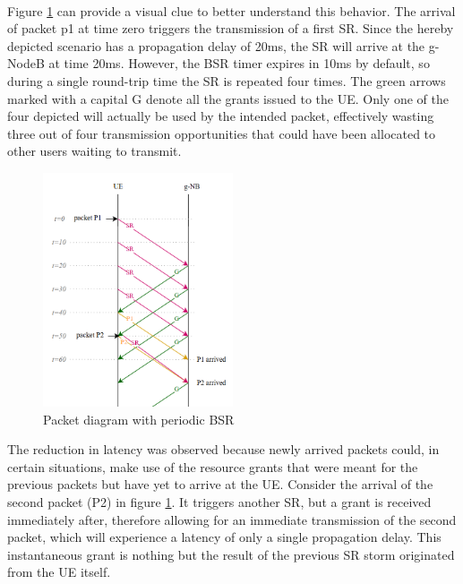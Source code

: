 \paragraph{}
Figure \ref{fig:diagram-wasted-capacity} can provide a visual clue to better understand this behavior. The arrival of packet p1 at time zero triggers the transmission of a first \ac{SR}. Since the hereby depicted scenario has a propagation delay of 20ms, the \ac{SR} will arrive at the g-NodeB at time 20ms. However, the \ac{BSR} timer expires in 10ms by default, so during a single round-trip time the \ac{SR} is repeated four times. The green arrows marked with a capital G denote all the grants issued to the \ac{UE}. Only one of the four depicted will actually be used by the intended packet, effectively wasting three out of four transmission opportunities that could have been allocated to other users waiting to transmit.

\begin{figure}[ht]
    \centering
    \includegraphics[width=0.5\textwidth]{res/diagram-wasted-grants.png}
    \caption{Packet diagram with periodic \ac{BSR}}
    \label{fig:diagram-wasted-capacity}
\end{figure}

The reduction in latency was observed because newly arrived packets could, in certain situations, make use of the resource grants that were meant for the previous packets but have yet to arrive at the \ac{UE}. Consider the arrival of the second packet (P2) in figure \ref{fig:diagram-wasted-capacity}. It triggers another \ac{SR}, but a grant is received immediately after, therefore allowing for an immediate transmission of the second packet, which will experience a latency of only a single propagation delay. This instantaneous grant is nothing but the result of the previous \ac{SR} storm originated from the \ac{UE} itself.

